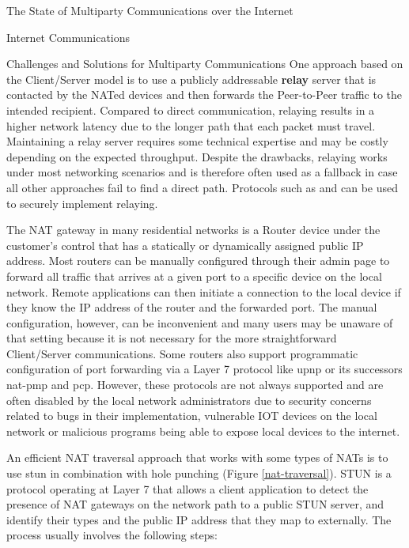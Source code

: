 \begin{frame}[fragile]{The State of Multiparty Communications over the
Internet}
\begin{block}{Internet Communications}
\begin{block}{Challenges and Solutions for Multiparty Communications}
One approach based on the Client/Server model is to use a publicly
addressable \textbf{relay} server that is contacted by the NATed devices
and then forwards the Peer-to-Peer traffic to the intended recipient.
Compared to direct communication, relaying results in a higher network
latency due to the longer path that each packet must travel. Maintaining
a relay server requires some technical expertise and may be costly
depending on the expected throughput. Despite the drawbacks, relaying
works under most networking scenarios and is therefore often used as a
fallback in case all other approaches fail to find a direct path.
Protocols such as  \autocite{turnRFC} and 
\autocite{derpDocs} can be used to securely implement relaying.

The NAT gateway in many residential networks is a Router device under
the customer's control that has a statically or dynamically assigned
public IP address. Most routers can be manually configured through their
admin page to forward all traffic that arrives at a given port to a
specific device on the local network. Remote applications can then
initiate a connection to the local device if they know the IP address of
the router and the forwarded port. The manual configuration, however,
can be inconvenient and many users may be unaware of that setting
because it is not necessary for the more straightforward Client/Server
communications. Some routers also support programmatic configuration of
port forwarding via a Layer 7 protocol like \gls{upnp} or its successors
\gls{nat-pmp} and \gls{pcp}. However, these protocols are not always
supported and are often disabled by the local network administrators due
to security concerns related to bugs in their implementation, vulnerable
IOT devices on the local network or malicious programs being able to
expose local devices to the internet.


An efficient NAT traversal approach that works with some types of NATs
is to use \gls{stun} \autocite{stunRFC} in combination with 
hole punching (Figure \ref{nat-traversal}). STUN is a protocol operating
at Layer 7 that allows a client application to detect the presence of
NAT gateways on the network path to a public STUN server, and identify
their types and the public IP address that they map to externally. The
process usually involves the following steps:


\end{block}
\end{block}
\end{frame}
